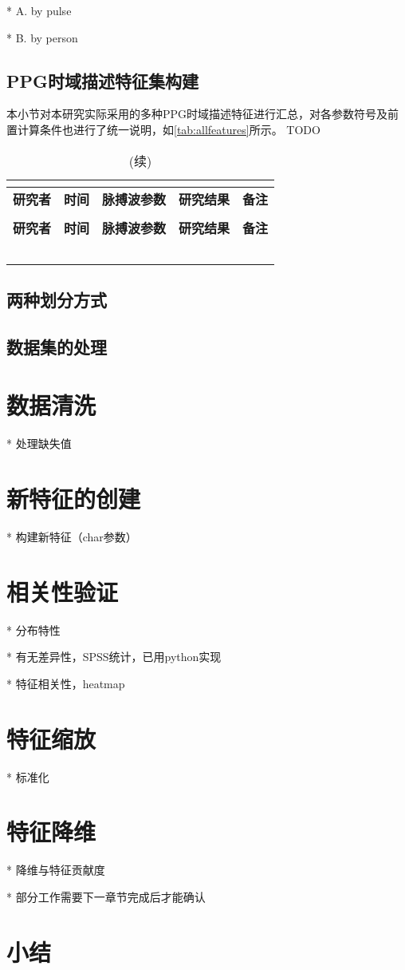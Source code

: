   * A. by pulse

  * B. by person
\subsection{PPG时域描述特征集构建}

本小节对本研究实际采用的多种PPG时域描述特征进行汇总，对各参数符号及前置计算条件也进行了统一说明，如\autoref{tab:allfeatures}所示。
TODO
\begin{center}
    \fontsize{10}{4}
    \begin{longtable}{p{3cm}<{\centering}p{1cm}<{\centering}p{2cm}<{\centering}p{6cm}<{\centering}p{1cm}<{\centering}}
        \caption{本研究使用的所有PPG时域指标一览}\\
        \label{tab:allfeatures}\\
        \hline\hline
            \textbf{研究者}&\textbf{时间}&\textbf{脉搏波参数}&\textbf{研究结果}&\textbf{备注}\\
        \hline
        \endfirsthead
        \caption[]{(续)}\\
        \hline
            \textbf{研究者}&\textbf{时间}&\textbf{脉搏波参数}&\textbf{研究结果}&\textbf{备注}\\
        \hline
        \endhead 
        \hline
        \endfoot
        \hline\hline
        \endlastfoot
        &       &       &       &  \\
        &       &       &       &  \\
        &       &       &       &  \\
        &       &       &       &  \\
        &       &       &       &  \\
    \end{longtable}
\end{center}
\subsection{两种划分方式}
\subsection{数据集的处理}

\section{数据清洗}
* 处理缺失值

\section{新特征的创建}
* 构建新特征（char参数）
\section{相关性验证}
* 分布特性

  * 有无差异性，SPSS统计，已用python实现

  * 特征相关性，heatmap
\section{特征缩放}
* 标准化
\section{特征降维}
* 降维与特征贡献度

* 部分工作需要下一章节完成后才能确认
\section{小结}